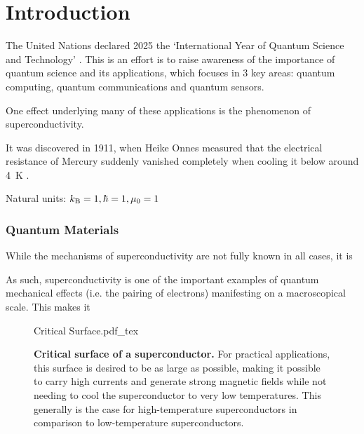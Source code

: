 \documentclass[../notes.tex]{subfiles}
\begin{document}
\raggedbottom
	
\chapter{Introduction}

The United Nations declared 2025 the `International Year of Quantum Science and Technology' \cite{unitednationsInternationalYearQuantum2024}.
This is an effort is to raise awareness of the importance of quantum science and its applications, which focuses in 3 key areas: quantum computing, quantum communications and quantum sensors.

One effect underlying many of these applications is the phenomenon of superconductivity.

It was discovered in 1911, when Heike Onnes measured that the electrical resistance of Mercury suddenly vanished completely when cooling it below around \qty{4}{\kelvin} \cite{onnesFurtherExperimentsLiquid1991}.

Natural units: \(k_{\mathrm{B}} = 1, \hbar = 1, \mu_0 = 1\)


\subsection*{Quantum Materials}



While the mechanisms of superconductivity are not fully known in all cases, it is 

As such, superconductivity is one of the important examples of quantum mechanical effects (i.e. the pairing of electrons) manifesting on a macroscopical scale.
This makes it 

\begin{SCfigure}[50][t]
	\centering
	{Critical Surface.pdf_tex}
	\caption{\textbf{Critical surface of a superconductor.} For practical applications, this surface is desired to be as large as possible, making it possible to carry high currents and generate strong magnetic fields while not needing to cool the superconductor to very low temperatures. This generally is the case for high-temperature superconductors in comparison to low-temperature superconductors. }
	\label{fig:Critical Surface of a SC}
\end{SCfigure}

\end{document}
